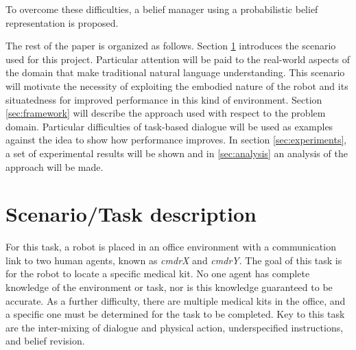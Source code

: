 \documentclass[12pt]{article}
\begin{document}








To overcome these difficulties, a belief manager using a probabilistic
belief representation is proposed.

The rest of the paper is organized as follows. Section
\ref{sec:scenaro} introduces the scenario used for this
project. Particular attention will be paid to the real-world aspects
of the domain that make traditional natural language
understanding. This scenario will motivate the necessity of exploiting
the embodied nature of the robot and its situatedness for improved
performance in this kind of environment. Section \ref{sec:framework}
will describe the approach used with respect to the problem
domain. Particular difficulties of task-based dialogue will be used as
examples against the idea to show how performance improves. In section
\ref{sec:experiments}, a set of experimental results will be shown and
in \ref{sec:analysis} an analysis of the approach will be made.

\section{Scenario/Task description}
\label{sec:scenaro}
For this task, a robot is placed in an office environment with a
communication link to two human agents, known as \textit{cmdrX} and
\textit{cmdrY}. The goal of this task is for the robot to locate a
specific medical kit. No one agent has complete knowledge of the
environment or task, nor is this knowledge guaranteed to be accurate.
As a further difficulty, there are multiple medical kits in the
office, and a specific one must be determined for the task to be
completed. Key to this task are the inter-mixing of dialogue and
physical action, underspecified instructions, and belief revision.
\end{document}
